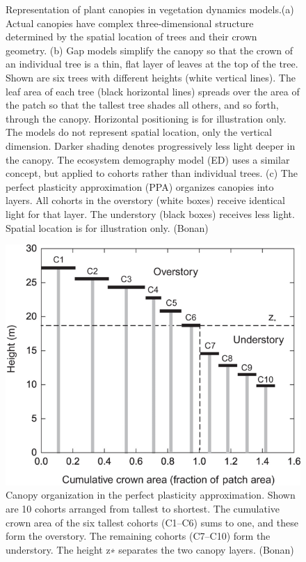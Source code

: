 \documentclass[12pt,oneside]{book}
\begin{document}
\begin{figure}
{}

\caption{Representation of plant canopies in vegetation dynamics models.(a) Actual canopies have complex three-dimensional structure determined by the spatial location of trees and their crown geometry. (b) Gap models simplify the canopy so that the crown of an individual tree is a thin, flat layer of leaves at the top of the tree. Shown are six trees with different heights (white vertical lines). The leaf area of each tree (black horizontal lines) spreads over the area of the patch so that the tallest tree shades all others, and so forth, through the canopy. Horizontal positioning is for illustration only. The models do not represent spatial location, only the vertical dimension. Darker shading denotes progressively less light deeper in the canopy. The ecosystem demography model (ED) uses a similar concept, but applied to cohorts rather than individual trees. (c) The perfect plasticity approximation (PPA) organizes canopies into layers. All cohorts in the overstory (white boxes) receive identical light for that layer. The understory (black boxes) receives less light. Spatial location is for illustration only. (Bonan)}\label{fig:f627}
\end{figure}

\begin{figure}

{\centering \includegraphics[width=0.8\linewidth]{figures/chap6/f628_ppa} 

}

\caption{Canopy organization in the perfect plasticity approximation. Shown are 10 cohorts arranged from tallest to shortest. The cumulative crown area of the six tallest cohorts (C1–C6) sums to one, and these form the overstory. The remaining cohorts (C7–C10) form the understory. The height z∗ separates the two canopy layers. (Bonan)}\label{fig:f628}
\end{figure}
\end{document}

